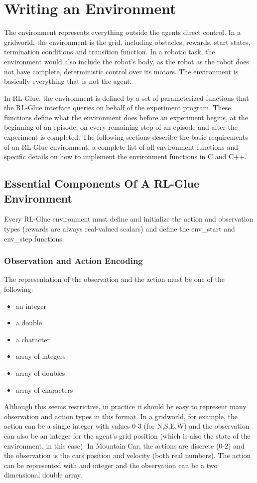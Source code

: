 \documentclass[11pt]{article}
\begin{document}
\section{Writing an Environment}
\label{env}
The environment represents everything outside the agents direct control. In a gridworld, the environment is the grid, including obstacles, rewards, start states, termination conditions and transition function. In a robotic task, the environment would also include the robot's body, as the robot as the robot does not have complete, deterministic control over its motors. The environment is basically everything that is not the agent.

In RL-Glue, the environment is defined by a set of parameterized functions that the RL-Glue interface queries on behalf of the experiment program. These functions define what the environment does before an experiment begins, at the beginning of an episode, on every remaining step of an episode and after the experiment is completed. The following sections describe the basic requirements of an RL-Glue environment, a complete list of all environment functions and specific details on how to implement the environment functions in C and C++.


\subsection{Essential Components Of A RL-Glue Environment}
\label{envp1}

Every RL-Glue environment must define and initialize the action and observation types (rewards are always real-valued scalars) and define the env\_start and env\_step functions.   

\subsubsection{Observation and Action Encoding}
The representation of the observation and the action must be one of the following: 
\begin{itemize}
\item an integer
\item a double
\item a character
\item array of integers
\item array of doubles
\item array of characters
\end{itemize}
Although this seems restrictive, in practice it should be easy to represent many observation and action types in this format. In a gridworld, for example, the action can be a single integer with values 0-3 (for N,S,E,W) and the observation can also be an integer for the agent's grid position (which is also the state of the environment, in this case). In Mountain Car, the actions are discrete (0-2) and the observation is the cars position and velocity (both real numbers). The action can be represented with and integer and the observation can be a two dimensional double array. 
\end{document}
